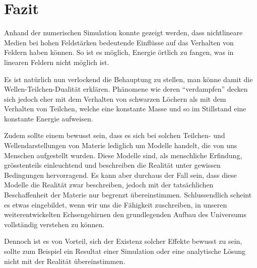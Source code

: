 %
%
%
%
\section{Fazit\label{particles:section:fazit}}

Anhand der numerischen Simulation konnte gezeigt werden, dass nichtlineare Medien bei hohen Feldstärken bedeutende Einflüsse auf das Verhalten von Feldern haben können.
So ist es möglich, Energie örtlich zu fangen, was in linearen Feldern nicht möglich ist.

Es ist natürlich nun verlockend die Behauptung zu stellen, man könne damit die Wellen-Teilchen-Dualität erklären.
Phänomene wie deren ``verdampfen'' decken sich jedoch eher mit dem Verhalten von schwarzen Löchern als mit dem Verhalten von Teilchen, welche eine konstante Masse und so im Stillstand eine konstante Energie aufweisen.

Zudem sollte einem bewusst sein, dass es sich bei solchen Teilchen- und Wellendarstellungen von Materie lediglich um Modelle handelt, die von uns Menschen aufgestellt wurden.
Diese Modelle sind, als menschliche Erfindung, grösstenteils einleuchtend und beschreiben die Realität unter gewissen Bedingungen hervorragend.
Es kann aber durchaus der Fall sein, dass diese Modelle die Realität zwar beschreiben, jedoch mit der tatsächlichen Beschaffenheit der Materie nur begrenzt übereinstimmen.
Schlussendlich scheint es etwas eingebildet, wenn wir uns die Fähigkeit zuschreiben, in unseren weiterentwickelten Echsengehirnen den grundlegenden Aufbau des Universums vollständig verstehen zu können.

Dennoch ist es von Vorteil, sich der Existenz solcher Effekte bewusst zu sein, sollte zum Beispiel ein Resultat einer Simulation oder eine analytische Lösung nicht mit der Realität übereinstimmen.


